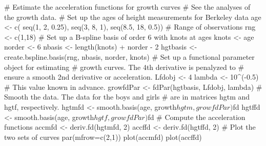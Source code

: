 \documentclass{article}
\begin{document}
\begin{Examples}
\begin{ExampleCode}

#  Estimate the acceleration functions for growth curves
#  See the analyses of the growth data.
#  Set up the ages of height measurements for Berkeley data
age <- c( seq(1, 2, 0.25), seq(3, 8, 1), seq(8.5, 18, 0.5))
#  Range of observations
rng <- c(1,18)
#  Set up a B-spline basis of order 6 with knots at ages
knots  <- age
norder <- 6
nbasis <- length(knots) + norder - 2
hgtbasis <- create.bspline.basis(rng, nbasis, norder, knots)
#  Set up a functional parameter object for estimating
#  growth curves.  The 4th derivative is penalyzed to
#  ensure a smooth 2nd derivative or acceleration.
Lfdobj <- 4
lambda <- 10^(-0.5)   #  This value known in advance.
growfdPar <- fdPar(hgtbasis, Lfdobj, lambda)
#  Smooth the data.  The data for the boys and girls
#  are in matrices hgtm and hgtf, respectively.
hgtmfd <- smooth.basis(age, growth$hgtm, growfdPar)$fd
hgtffd <- smooth.basis(age, growth$hgtf, growfdPar)$fd
#  Compute the acceleration functions
accmfd <- deriv.fd(hgtmfd, 2)
accffd <- deriv.fd(hgtffd, 2)
#  Plot the two sets of curves
par(mfrow=c(2,1))
plot(accmfd)
plot(accffd)

\end{ExampleCode}
\end{Examples}
\end{document}
